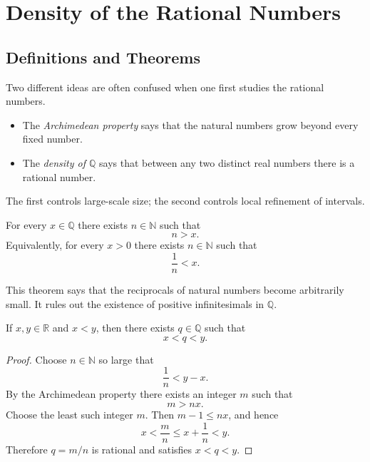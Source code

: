 
\section{Density of the Rational Numbers}
\label{sec:density-q}

\subsection{Definitions and Theorems}

Two different ideas are often confused when one first studies the rational numbers.

\begin{itemize}
  \item The \emph{Archimedean property} says that the natural numbers grow beyond every fixed
  number.
  \item The \emph{density of $\mathbb{Q}$} says that between any two distinct real numbers there is a
  rational number.
\end{itemize}

The first controls large-scale size; the second controls local refinement of intervals.

\begin{theorem}
\label{thm:archimedean-q}
For every $x\in\mathbb{Q}$ there exists $n\in\mathbb{N}$ such that
\[
n>x.
\]
Equivalently, for every $x>0$ there exists $n\in\mathbb{N}$ such that
\[
\frac{1}{n}<x.
\]
\end{theorem}

\begin{remark}
This theorem says that the reciprocals of natural numbers become arbitrarily small.  It rules out the
existence of positive infinitesimals in $\mathbb{Q}$.
\end{remark}

\begin{theorem}
\label{thm:q-dense-in-r}
If $x,y\in\mathbb{R}$ and $x<y$, then there exists $q\in\mathbb{Q}$ such that
\[
x<q<y.
\]
\end{theorem}

\begin{proof}
Choose $n\in\mathbb{N}$ so large that
\[
\frac{1}{n}<y-x.
\]
By the Archimedean property there exists an integer $m$ such that
\[
m>nx.
\]
Choose the least such integer $m$.  Then $m-1\le nx$, and hence
\[
x<\frac{m}{n}\le x+\frac{1}{n}<y.
\]
Therefore $q=m/n$ is rational and satisfies $x<q<y$.
\end{proof}


